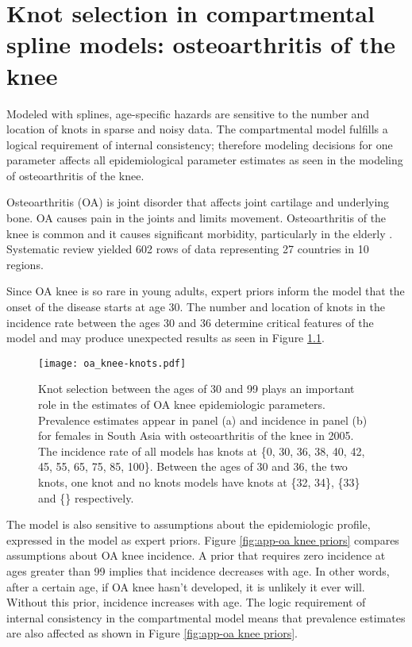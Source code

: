 \chapter{Knot selection in compartmental spline models: osteoarthritis of the knee}
\label{applications-con_fit_splines}

Modeled with splines, age-specific hazards are sensitive to the number and location of knots in sparse and noisy data.  The compartmental model fulfills a logical requirement of internal consistency; therefore modeling decisions for one parameter affects all epidemiological parameter estimates as seen in the modeling of osteoarthritis of the knee.

Osteoarthritis (OA) is joint disorder that affects joint cartilage and underlying bone.  OA causes pain in the joints and limits movement.  Osteoarthritis of the knee is common and it causes significant morbidity, particularly in the elderly \cite{felson_epidemiology_1988, felson_incidence_1995}.  Systematic review yielded 602 rows of data representing 27 countries in 10 regions.

Since OA knee is so rare in young adults, expert priors inform the model that the onset of the disease starts at age 30.  The number and location of knots in the incidence rate between the ages 30 and 36 determine critical features of the model and may produce unexpected results as seen in Figure \ref{fig:app-oa knee knots}.

    \begin{figure}[h]
        \begin{center}
            \texttt{[image: oa\_knee-knots.pdf]}
            \caption{Knot selection between the ages of 30 and 99 plays an important role in the estimates of OA knee epidemiologic parameters.  Prevalence estimates appear in panel (a) and incidence in panel (b) for females in South Asia with osteoarthritis of the knee in 2005.  The incidence rate of all models has knots at \{0, 30, 36, 38, 40, 42, 45, 55, 65, 75, 85, 100\}.  Between the ages of 30 and 36, the two knots, one knot and no knots models have knots at \{32, 34\}, \{33\} and \{\} respectively.}
            \label{fig:app-oa knee knots}
        \end{center}
    \end{figure}

The model is also sensitive to assumptions about the epidemiologic profile, expressed in the model as expert priors.  Figure \ref{fig:app-oa knee priors} compares assumptions about OA knee incidence.  A prior that requires zero incidence at ages greater than 99 implies that incidence decreases with age.  In other words, after a certain age, if OA knee hasn't developed, it is unlikely it ever will. Without this prior, incidence increases with age.  The logic requirement of internal consistency in the compartmental model means that prevalence estimates are also affected as shown in Figure \ref{fig:app-oa knee priors}.

